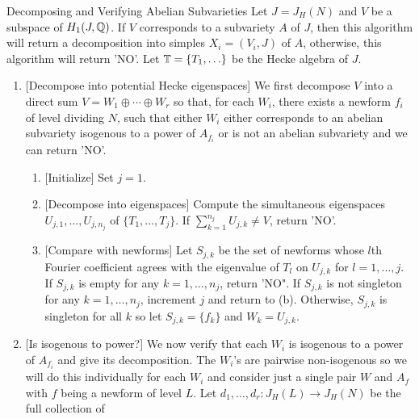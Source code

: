 \documentclass{article}
\begin{document}
\begin{algorithm}{Decomposing and Verifying Abelian Subvarieties}
    \label{alg:decomp_and_verify_subvarieties}
    Let $J=J_H(N)$ and $V$ be a subspace of $H_1(J, \mathbb{Q})$. If $V$ corresponds
    to a subvariety $A$ of $J$, then this algorithm will return a decomposition
    into simples $X_i=(V_i, J)$ of $A$, otherwise, this algorithm will return
    'NO'. Let $\mathbb{T}=\{T_1,\ldots\}$ be the Hecke algebra of $J$.
    \begin{enumerate}
        \item{} [Decompose into potential Hecke eigenspaces]
            We first decompose $V$ into a direct sum $V=W_1\oplus \cdots \oplus
            W_r$ so that, for each $W_i$, there exists a newform $f_i$ of level
            dividing $N$, such that either $W_i$ either corresponds to an
            abelian subvariety isogenous to a power of $A_{f_i}$ or is not an
            abelian subvariety and we can return 'NO'.
            \begin{enumerate}
                \item{} [Initialize]
                    Set $j=1$.
                \item{} [Decompose into eigenspaces]
                    Compute the simultaneous eigenspaces $U_{j,1},\ldots,U_{j,
                    n_j}$ of $\{T_1,\ldots,T_j\}$. If $\sum_{k=1} ^{n_j}
                    U_{j, k}\neq V$, return 'NO'.
                \item{} [Compare with newforms]
                    Let $S_{j,k}$ be the set of newforms whose $l$th Fourier
                    coefficient agrees with the eigenvalue of $T_l$ on $U_{j,
                    k}$ for $l=1,\ldots,j$. If $S_{j, k}$ is empty for any
                    $k=1,\ldots,n_j$, return 'NO". If $S_{j,k}$ is not
                    singleton for any $k=1,\ldots, n_j$, increment $j$ and
                    return to (b). Otherwise, $S_{j,k}$ is singleton for all
                    $k$ so let $S_{j,k}=\{f_k\}$ and $W_k=U_{j,k}$.
            \end{enumerate}
        \item{} [Is isogenous to power?]
            We now verify that each $W_i$ is isogenous to a power of $A_{f_i}$
            and give its decomposition. The $W_i$'s are pairwise non-isogenous
            so we will do this individually for each $W_i$ and consider just a
            single pair $W$ and $A_f$ with $f$ being a newform of level $L$.
            Let $d_1,\ldots,d_r:J_H(L)\to J_H(N)$ be the full collection of

\end{enumerate}
\end{algorithm}
\end{document}
